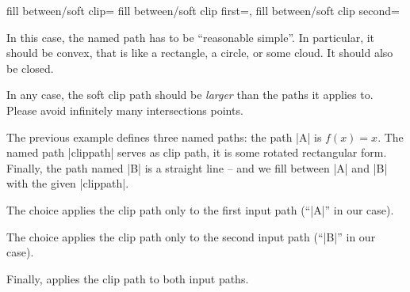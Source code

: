 \begin{tikzkeylist}{%
	fill between/soft clip=
	fill between/soft clip first=,
	fill between/soft clip second=%
}
\begin{itemize}
		In this case, the named path has to be ``reasonable simple''. In particular, it should be convex, that is like a rectangle, a circle, or some cloud. It should also be closed.
	\end{itemize}
	In any case, the soft clip path should be \emph{larger} than the paths it applies to. Please avoid infinitely many intersections points.

\begin{codeexample}[]
\end{codeexample}
	\noindent The previous example defines three named paths: the path |A| is $f(x) = x$. The named path |clippath| serves as clip path, it is some rotated rectangular form. Finally, the path named |B| is a straight line -- and we fill between |A| and |B| with the given |clippath|. 
	
	The choice  applies the clip path only to the first input path (``|A|'' in our case).

	The choice  applies the clip path only to the second input path (``|B|'' in our case).

	Finally,  applies the clip path to both input paths.
\begin{codeexample}[]
\end{codeexample}



\end{tikzkeylist}
